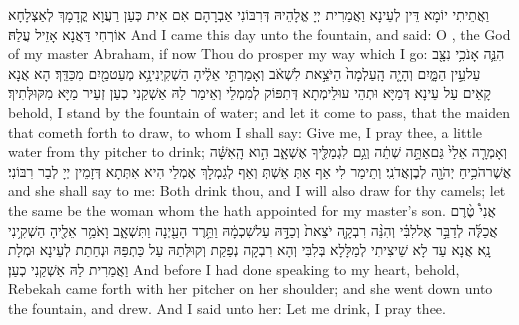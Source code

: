 {וַאֲתֵיתִי יוֹמָא דֵּין לְעֵינָא וַאֲמַרִית יְיָ אֱלָהֵיהּ דְּרִבּוֹנִי אַבְרָהָם אִם אִית כְּעַן רַעֲוָא קֳדָמָךְ לְאַצְלָחָא אוֹרְחִי דַּאֲנָא אָזֵיל עֲלַהּ׃}
{And I came this day unto the fountain, and said: O \lord, the God of my master Abraham, if now Thou do prosper my way which I go:}{}
{הִנֵּ֛ה אָנֹכִ֥י נִצָּ֖ב עַל\maqqaf עֵ֣ין הַמָּ֑יִם וְהָיָ֤ה הָֽעַלְמָה֙ הַיֹּצֵ֣את לִשְׁאֹ֔ב וְאָמַרְתִּ֣י אֵלֶ֔יהָ הַשְׁקִֽינִי\maqqaf נָ֥א מְעַט\maqqaf מַ֖יִם מִכַּדֵּֽךְ׃}
{הָא אֲנָא קָאֵים עַל עֵינָא דְּמַיָּא וּתְהֵי עוּלֵימְתָא דְּתִפּוֹק לְמִמְלֵי וְאֵימַר לַהּ אַשְׁקַנִי כְעַן זְעֵיר מַיָּא מִקּוּלְּתִיךְ׃}
{behold, I stand by the fountain of water; and let it come to pass, that the maiden that cometh forth to draw, to whom I shall say: Give me, I pray thee, a little water from thy pitcher to drink;}{}
{וְאָמְרָ֤ה אֵלַי֙ גַּם\maqqaf אַתָּ֣ה שְׁתֵ֔ה וְגַ֥ם לִגְמַלֶּ֖יךָ אֶשְׁאָ֑ב הִ֣וא הָֽאִשָּׁ֔ה אֲשֶׁר\maqqaf הֹכִ֥יחַ יְהֹוָ֖ה לְבֶן\maqqaf אֲדֹנִֽי׃}
{וְתֵימַר לִי אַף אַתְּ אֵשְׁתְּ וְאַף לְגַמְלָךְ אֶמְלֵי הִיא אִתְּתָא דְּזָמֵין יְיָ לְבַר רִבּוֹנִי׃}
{and she shall say to me: Both drink thou, and I will also draw for thy camels; let the same be the woman whom the \lord\space hath appointed for my master’s son.}{}
{אֲנִי֩ טֶ֨רֶם אֲכַלֶּ֜ה לְדַבֵּ֣ר אֶל\maqqaf לִבִּ֗י וְהִנֵּ֨ה רִבְקָ֤ה יֹצֵאת֙ וְכַדָּ֣הּ עַל\maqqaf שִׁכְמָ֔הּ וַתֵּ֥רֶד הָעַ֖יְנָה וַתִּשְׁאָ֑ב וָאֹמַ֥ר אֵלֶ֖יהָ הַשְׁקִ֥ינִי נָֽא׃}
{אֲנָא עַד לָא שֵׁיצִיתִי לְמַלָּלָא בְּלִבִּי וְהָא רִבְקָה נְפַקַת וְקוּלְּתַהּ עַל כַּתְפַּהּ וּנְחַתַת לְעֵינָא וּמְלָת וַאֲמַרִית לַהּ אַשְׁקַנִי כְעַן׃}
{And before I had done speaking to my heart, behold, Rebekah came forth with her pitcher on her shoulder; and she went down unto the fountain, and drew. And I said unto her: Let me drink, I pray thee.}{}
